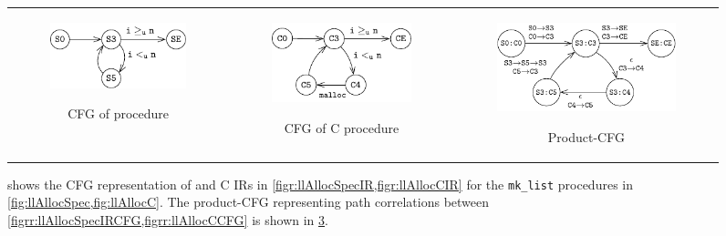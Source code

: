 \begin{figure}
\begin{tabular}{@{}c@{}c@{}c@{}}
\begin{subfigure}[b]{0.30\textwidth}
\begin{center}
{\includegraphics[scale=1.15]{chapters/figures/figMallocSpecCfg.pdf}}
\end{center}
\vspace{17px}
\caption{\label{figrr:llAllocSpecIRCFG}CFG of \SpecL{} procedure}
\end{subfigure}%
&
\begin{subfigure}[b]{0.30\textwidth}
\begin{center}
{\includegraphics[scale=1.1]{chapters/figures/figMallocCCfg.pdf}}
\end{center}
\vspace{5px}
\caption{\label{figrr:llAllocCCFG}CFG of C procedure}
\end{subfigure}%
&
\begin{subfigure}[b]{0.40\textwidth}
\begin{center}
{\includegraphics[scale=1.1]{chapters/figures/figMallocProductCfg.pdf}}
\end{center}
\caption{\label{figrr:llAllocProductCFG}Product-CFG}
\end{subfigure}%
\\
\end{tabular}
\caption{\label{figrr:llAllocAllCFGs} shows the CFG representation of \SpecL{} and C IRs in \cref{figr:llAllocSpecIR,figr:llAllocCIR}
for the {\tt mk\_list} procedures in \cref{fig:llAllocSpec,fig:llAllocC}.
The product-CFG representing path correlations between \cref{figrr:llAllocSpecIRCFG,figrr:llAllocCCFG} is shown in \cref{figrr:llAllocProductCFG}.}
\end{figure}